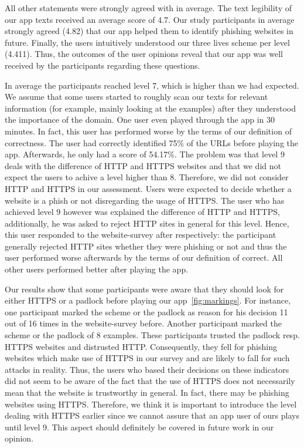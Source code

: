 \begin{description}[leftmargin=0cm]
	All other statements were strongly agreed with in average.
	The text legibility of our app texts received an average score of 4.7.
	Our study participants in average strongly agreed (4.82) that our app helped them to identify phishing websites in future.
	Finally, the users intuitively understood our three lives scheme per level (4.411).
	Thus, the outcomes of the user opinions reveal that our app was well received by the participants regarding these questions.
	\item[Achieved Levels:] In average the participants reached level 7, which is higher than we had expected.
	We assume that some users started to roughly scan our texts for relevant information (for example, mainly looking at the examples) after they understood the importance of the domain.
	One user even played through the app in 30 minutes.
	In fact, this user has performed worse by the terms of our definition of correctness.
	The user had correctly identified 75\% of the URLs before playing the app.
	Afterwards, he only had a score of 54.17\%.
	The problem was that level 9 deals with the difference of HTTP and HTTPS websites and that we did not expect the users to achive a level higher than 8.
	Therefore, we did not consider HTTP and HTTPS in our assessment.
	Users were expected to decide whether a website is a phish or not disregarding the usage of HTTPS.
	The user who has achieved level 9 however was explained the difference of HTTP and HTTPS, additionally, he was asked to reject HTTP sites in general for this level.
	Hence, this user responded to the website-survey after respectively: the participant generally rejected HTTP sites whether they were phishing or not and thus the user performed worse afterwards by the terms of our definition of correct.
	All other users performed better after playing the app.
	\item[HTTPS and Padlock:] Our results show that some participants were aware that they should look for either HTTPS or a padlock before playing our app~\autoref{fig:markings}.
	For instance, one participant marked the scheme or the padlock as reason for his decision 11 out of 16 times in the website-survey before. 
	Another participant marked the scheme or the padlock of 8 examples.
	These participants trusted the padlock resp. HTTPS websites and distrusted HTTP.
	Consequently, they fell for phishing websites which make use of HTTPS in our survey and are likely to fall for such attacks in reality.
	Thus, the users who based their decisions on these indicators did not seem to be aware of the fact that the use of HTTPS does not necessarily mean that the website is trustworthy in general.
	In fact, there may be phishing websites using HTTPS.
	Therefore, we think it is important to introduce the level dealing with HTTPS earlier since we cannot assure that an app user of ours plays until level 9.
	This aspect should definitely be covered in future work in our opinion.
	
\end{description}

